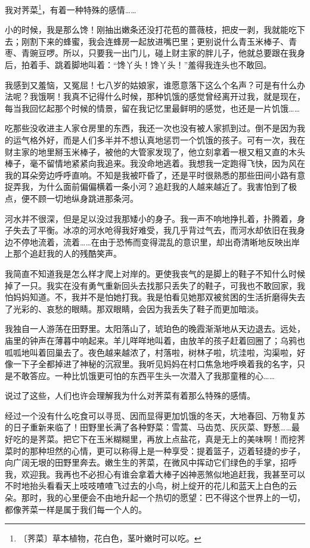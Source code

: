 \documentclass[12pt,UTF-8,openany]{ctexbook}
\begin{document}
\begin{large}
    
    我对荠菜\footnote{〔荠菜〕草本植物，花白色，茎叶嫩时可以吃。}，有着一种特殊的感情……
    
    小的时候，我是那么馋！刚抽出嫩条还没打花苞的蔷薇枝，把皮一剥，我就能吃下去；刚割下来的蜂蜜，我会连蜂房一起放进嘴巴里；更别说什么青玉米棒子、青枣、青豌豆啰。所以，只要我一出门儿，碰上财主家的胖儿子，他就总要跟在我身后，拍着手、跳着脚地叫着：“馋丫头！馋丫头！”羞得我连头也不敢回。
    
    我感到又羞恼，又冤屈！七八岁的姑娘家，谁愿意落下这么个名声？可是有什么办法呢？我饿啊！我真不记得什么时候，那种饥饿的感觉曾经离开过我，就是现在，每当我回忆起那个时候的情景，留在我记忆里最鲜明的感觉，也还是一片饥饿……
    
    吃那些没收进主人家仓房里的东西，我还一次也没有被人家抓到过。倒不是因为我的运气格外好，而是人们多半并不想认真地惩罚一个饥饿的孩子。可有一次，我在财主家的地里掰玉米棒子，被他的大管家发现了，他立刻拿着一根又粗又直的木头棒子，毫不留情地紧紧向我追来。我没命地逃着。我想我一定跑得飞快，因为风在我的耳朵旁边呼呼直响。不知是我被吓昏了，还是平时很熟悉的那些田间小路有意捉弄我，为什么面前偏偏横着一条小河？追赶我的人越来越近了。我害怕到了极点，便不顾一切地纵身跳进那条河。
    
    河水并不很深，但是足以没过我那矮小的身子。我一声不响地挣扎着，扑腾着，身子失去了平衡。冰凉的河水呛得我好难受，我几乎背过气去，而河水却依旧在我身边不停地流着，流着……在由于恐怖而变得混乱的意识里，却出奇清晰地反映出岸上那个追赶我的人的残酷笑声。
    
    我简直不知道我是怎么样才爬上对岸的。更使我丧气的是脚上的鞋子不知什么时候掉了一只。我实在没有勇气重新回头去找那只丢失了的鞋子，可我也不敢回家，我怕妈妈知道。不，我并不是怕她打我。我是怕看见她那双被贫困的生活折磨得失去了光彩的、哀愁的眼睛。那双眼睛，会因为我丢失了鞋子而更加暗淡。
    
    我独自一人游荡在田野里。太阳落山了，琥珀色的晚霞渐渐地从天边退去。远处，庙里的钟声在薄暮中响起来。羊儿咩咩地叫着，由放羊的孩子赶着回圈了；乌鸦也呱呱地叫着回巢去了。夜色越来越浓了，村落啦，树林子啦，坑洼啦，沟渠啦，好像一下子全都掉进了神秘的沉寂里。我听见妈妈在村口焦急地呼唤着我的名字，只是不敢答应。一种比饥饿更可怕的东西平生头一次潜入了我那童稚的心……
    
    说过了这些，人们也许会理解我为什么对荠菜有着那么特殊的感情。
    
    经过一个没有什么吃食可以寻觅、因而显得更加饥饿的冬天，大地春回、万物复苏的日子重新来临了！田野里长满了各种野菜：雪蒿、马齿苋、灰灰菜、野葱……最好吃的是荠菜。把它下在玉米糊糊里，再放上点盐花，真是无上的美味啊！而挖荠菜时的那种坦然的心情，更可以称得上是一种享受：提着篮子，迈着轻捷的步子，向广阔无垠的田野里奔去。嫩生生的荠菜，在微风中挥动它们绿色的手掌，招呼我，欢迎我。我再也不必担心有谁会拿着大棒子凶神恶煞似地追赶我，我甚至可以不时地抬头看看天上吱吱喳喳飞过去的小鸟，树上绽开的花儿和蓝天上白色的云朵。那时，我的心里便会不由地升起一个热切的愿望：巴不得这个世界上的一切，都像荠菜一样是属于我们每一个人的。
    

\end{large}
\end{document}
